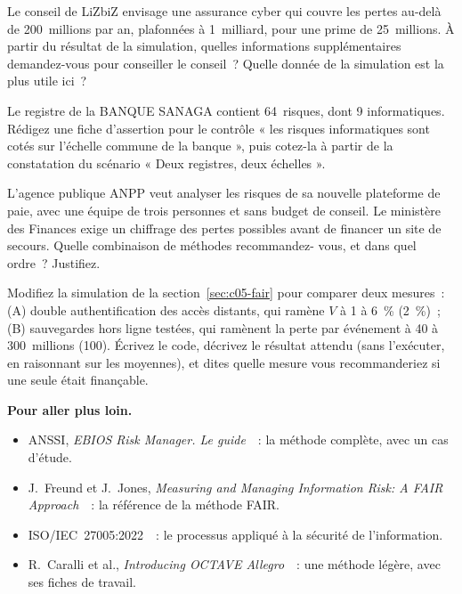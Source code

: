 \begin{boxexo}[title={\ding{45}\quad Exercice~5.7. Lire une distribution \niveaumoyen}]
Le conseil de LiZbiZ envisage une assurance cyber qui couvre les pertes
au-delà de 200~millions par an, plafonnées à 1~milliard, pour une prime de
25~millions. À partir du résultat de la simulation, quelles informations
supplémentaires demandez-vous pour conseiller le conseil~? Quelle donnée
de la simulation est la plus utile ici~?
\end{boxexo}

\begin{boxexo}[title={\ding{45}\quad Exercice~5.8. Auditer un registre \niveaumoyen}]
Le registre de la BANQUE SANAGA contient 64~risques, dont 9 informatiques.
Rédigez une fiche d'assertion pour le contrôle « les risques informatiques
sont cotés sur l'échelle commune de la banque », puis cotez-la à partir de
la constatation du scénario « Deux registres, deux échelles ».
\end{boxexo}

\begin{boxexo}[title={\ding{45}\quad Exercice~5.9. Choisir une méthode \niveauexpert}]
L'agence publique ANPP veut analyser les risques de sa nouvelle plateforme
de paie, avec une équipe de trois personnes et sans budget de conseil. Le
ministère des Finances exige un chiffrage des pertes possibles avant de
financer un site de secours. Quelle combinaison de méthodes recommandez-
vous, et dans quel ordre~? Justifiez.
\end{boxexo}

\begin{boxexo}[title={\ding{45}\quad Exercice~5.10. Simulation et décision \niveauexpert}]
Modifiez la simulation de la section~\ref{sec:c05-fair} pour comparer deux
mesures~: (A) double authentification des accès distants, qui ramène $V$ à
1 à 6~\% (2~\%)~; (B) sauvegardes hors ligne testées, qui ramènent la perte
par événement à 40 à 300~millions (100). Écrivez le code, décrivez le
résultat attendu (sans l'exécuter, en raisonnant sur les moyennes), et
dites quelle mesure vous recommanderiez si une seule était finançable.
\end{boxexo}

\bigskip

\begin{boxinfo}
\textbf{Pour aller plus loin.}
\begin{itemize}
    \item ANSSI, \textit{EBIOS Risk Manager. Le guide}~\cite{anssi2018ebios}~:
          la méthode complète, avec un cas d'étude.
    \item J.~Freund et J.~Jones, \textit{Measuring and Managing
          Information Risk: A FAIR Approach}~\cite{freund2014fair}~: la
          référence de la méthode FAIR.
    \item ISO/IEC~27005:2022~\cite{iso27005_2022}~: le processus appliqué à
          la sécurité de l'information.
    \item R.~Caralli et al., \textit{Introducing OCTAVE
          Allegro}~\cite{caralli2007octave}~: une méthode légère, avec ses
          fiches de travail.
\end{itemize}
\end{boxinfo}

